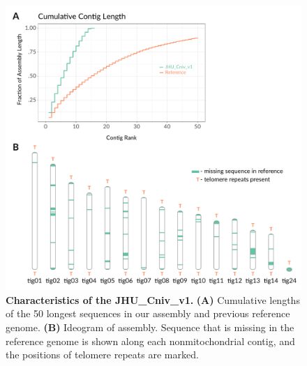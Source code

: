 \begin{kframe}
\begin{alltt}
 \hlkwb{<-} \hlstd{(} \hlstr{'.pdf\}
\textbackslash{}\textbackslash{}caption['}\hlstr{']\{\{\textbackslash{}\textbackslash{}bf '}\hlstd{)}
\end{alltt}
\end{kframe}\begin{figure}[!ht]
\centering
\includegraphics[width = 1\linewidth,keepaspectratio]{figure/asms.pdf}
\caption[Characteristics of the JHU_Cniv_v1]{{\bf Characteristics of the JHU_Cniv_v1.} {\bf (A)} Cumulative lengths of the 50 longest sequences in our assembly and previous reference genome. {\bf (B)} Ideogram of assembly. Sequence that is missing in the reference genome is shown along each nonmitochondrial contig, and the positions of telomere repeats are marked. }
\label{fig:asms}
\end{figure}

